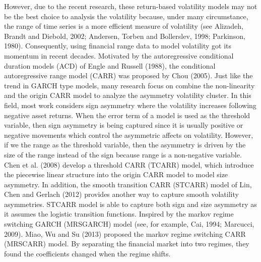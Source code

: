 \documentclass[
journal=jacsat, %
manuscript=article]{achemso}
\begin{document}
\begin{CJK*}{UTF8}{song}
However, due to the recent research, these return-based volatility models may not be the best choice to analysis the volatility because, under many circumstance, the range of time series is a more efficient measure of volatility (see Alizadeh, Brandt and Diebold, 2002; Andersen, Torben and Bollerslev, 1998; Parkinson, 1980). Consequently, using financial range data to model volatility got its momentum in recent decades. Motivated by the autoregressive conditional duration models (ACD) of Engle and Russell (1988), the conditional autoregressive range model (CARR) was proposed by Chou (2005). Just like the trend in GARCH type models, many research focus on combine the non-linearity and the origin CARR model to analyze the asymmetry volatility cluster. In this field, most work considers sign asymmetry where the volatility increases following negative asset returns. When the error term of a model is used as the threshold variable, then sign asymmetry is being captured since it is usually positive or negative movements which control the asymmetric affects on volatility. However, if we the range as the threshold variable, then the asymmetry is driven by the size of the range instead of the sign because range is a non-negative variable. Chen et al. (2008) develop a threshold CARR (TCARR) model, which introduce the piecewise linear structure into the origin CARR model to model size asymmetry. In addition, the smooth transition CARR (STCARR) model of Lin, Chen and Gerlach (2012) provides another way to capture smooth volatility asymmetries. STCARR model is able to capture both sign and size asymmetry as it assumes the logistic transition functions. Inspired by the markov regime switching GARCH (MRSGARCH) model (see, for example, Cai, 1994; Marcucci, 2009). Miao, Wu and Su (2013) proposed the markov regime switching CARR (MRSCARR) model. By separating the financial market into two regimes, they found the coefficients changed when the regime shifts.


\end{CJK*}
\end{document}
